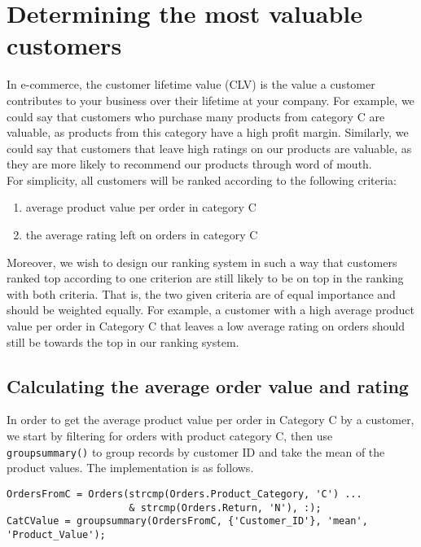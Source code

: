 \newpage
\section{Determining the most valuable customers}
In e-commerce, the customer lifetime value (CLV) is the value a customer contributes to your business over their lifetime at your company. For example, we could say that customers who purchase many products from category C are valuable, as products from this category have a high profit margin. Similarly, we could say that customers that leave high ratings on our products are valuable, as they are more likely to recommend our products through word of mouth. \\

\noindent
For simplicity, all customers will be ranked according to the following criteria:
\begin{enumerate}[label=(\arabic*)]
  \item average product value per order in category C
  \item the average rating left on orders in category C
\end{enumerate}

\noindent
Moreover, we wish to design our ranking system in such a way that customers ranked top according to one criterion are still likely to be on top in the ranking with both criteria. That is, the two given criteria are of equal importance and should be weighted equally. For example, a customer with a high average product value per order in Category C that leaves a low average rating on orders should still be towards the top in our ranking system.

\subsection{Calculating the average order value and rating}
In order to get the average product value per order in Category C by a customer, we start by filtering for orders with product category C, then use \lstinline|groupsummary()| to group records by customer ID and take the mean of the product values. The implementation is as follows.

\begin{lstlisting}
OrdersFromC = Orders(strcmp(Orders.Product_Category, 'C') ...
                     & strcmp(Orders.Return, 'N'), :);
CatCValue = groupsummary(OrdersFromC, {'Customer_ID'}, 'mean', 'Product_Value');
\end{lstlisting}

